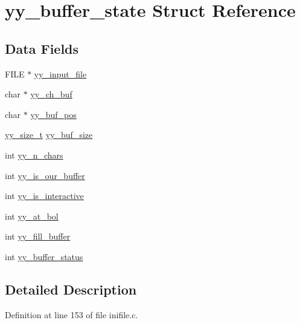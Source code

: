 \hypertarget{structyy__buffer__state}{\section{yy\-\_\-buffer\-\_\-state Struct Reference}
\label{structyy__buffer__state}
}
\subsection*{Data Fields}
\begin{DoxyCompactItemize}
\item 
F\-I\-L\-E $\ast$ \hyperlink{structyy__buffer__state_afb2a40bf9a1b84be81d8e8c0bbcbee21}{yy\-\_\-input\-\_\-file}
\item 
char $\ast$ \hyperlink{structyy__buffer__state_af61a9e79f8fc1edb3ae8a2fa2952ce22}{yy\-\_\-ch\-\_\-buf}
\item 
char $\ast$ \hyperlink{structyy__buffer__state_ae8850ab3d90f9339c392020e7d83c4c7}{yy\-\_\-buf\-\_\-pos}
\item 
\hyperlink{inifile_8c_aa14cc3d400000eef0cd40225fd790cfe}{yy\-\_\-size\-\_\-t} \hyperlink{structyy__buffer__state_a98a79041ff2a95eaa8a5c6d1e1562306}{yy\-\_\-buf\-\_\-size}
\item 
int \hyperlink{structyy__buffer__state_aa86c122f2050dbfd365fcf547e6fc1c3}{yy\-\_\-n\-\_\-chars}
\item 
int \hyperlink{structyy__buffer__state_a1e64bbdc1343d886bee3af97e19644bc}{yy\-\_\-is\-\_\-our\-\_\-buffer}
\item 
int \hyperlink{structyy__buffer__state_a2a823a361fbbe1af51a957d0d0cbf4e2}{yy\-\_\-is\-\_\-interactive}
\item 
int \hyperlink{structyy__buffer__state_a8e60af6806593faf52d1cc01148af6e3}{yy\-\_\-at\-\_\-bol}
\item 
int \hyperlink{structyy__buffer__state_a5e492694db97a0d7760d8cc5fd058dfd}{yy\-\_\-fill\-\_\-buffer}
\item 
int \hyperlink{structyy__buffer__state_a6ca09e676a787676260c558a0f731285}{yy\-\_\-buffer\-\_\-status}
\end{DoxyCompactItemize}


\subsection{Detailed Description}


Definition at line 153 of file inifile.\-c.



